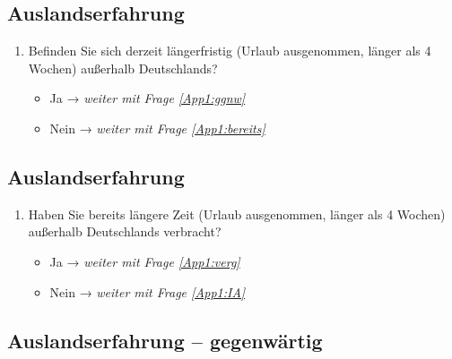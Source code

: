 
\subsection*{Auslandserfahrung}
\label{App1:SectionAuslandserfahrung}


\begin{enumerate}[resume]
\item Befinden Sie sich derzeit längerfristig (Urlaub ausgenommen, länger als 4 Wochen) außerhalb Deutschlands?\label{App1:derzeit}

    \begin{itemize}
		\item[\Circle] Ja → \textit{weiter mit Frage \ref{App1:ggnw}}
        \item[\Circle] Nein → \textit{weiter mit Frage \ref{App1:bereits}}
    \end{itemize}
\end{enumerate}

\subsection*{Auslandserfahrung}


\begin{enumerate}[resume]
\item Haben Sie bereits längere Zeit (Urlaub ausgenommen, länger als 4 Wochen) außerhalb Deutschlands verbracht?\label{App1:bereits}

		\begin{itemize}
		\item[\Circle] Ja → \textit{weiter mit Frage \ref{App1:verg}}
        \item[\Circle] Nein → \textit{weiter mit Frage \ref{App1:IA}}
        \end{itemize}

\end{enumerate}

\subsection*{Auslandserfahrung -- gegenwärtig}

